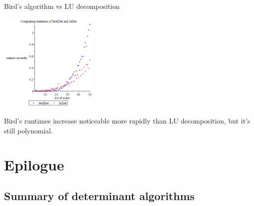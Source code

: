 \documentclass{beamer}
\begin{document}
\begin{frame}{Bird's algorithm vs LU decomposition}
    \begin{center}{}
        \includegraphics[height=180]{bird-lu}
    \end{center}

    Bird's runtimes increase noticeable more rapidly than LU decomposition,
    but it's still polynomial.
\end{frame}

\section{Epilogue}

\subsection{Summary of determinant algorithms}
\end{document}
